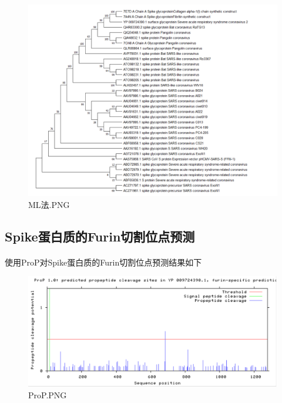 \documentclass[supercite]{HustGraduPaper}
\begin{document}
	\begin{figure}[H]
		\centering
		\includegraphics[width=1\textwidth]{./material/practice4/ML.png}
		\caption{ML法.PNG}
	\end{figure}

	\subsection{Spike蛋白质的Furin切割位点预测}
	  \paragraph{}\label{subpara:subpara}使用ProP对Spike蛋白质的Furin切割位点预测结果如下
		\begin{figure}[H]
			\centering
			\includegraphics[width=1\textwidth]{./material/practice4/prop.png}
			\caption{ProP.PNG}
		\end{figure}
\end{document}
